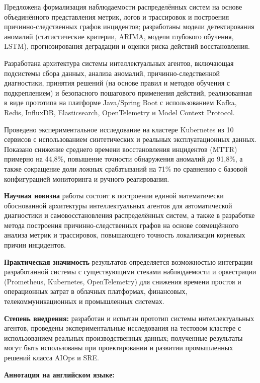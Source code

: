 Предложена формализация наблюдаемости распределённых систем на основе объединённого представления метрик, логов и трассировок и построения причинно-следственных графов инцидентов; разработаны модели детектирования аномалий (статистические критерии, ARIMA, модели глубокого обучения, LSTM), прогнозирования деградации и оценки риска действий восстановления.

Разработана архитектура системы интеллектуальных агентов, включающая подсистемы сбора данных, анализа аномалий, причинно-следственной диагностики, принятия решений (на основе правил и методов обучения с подкреплением) и безопасного пошагового применения действий, реализованная в виде прототипа на платформе Java/Spring Boot с использованием Kafka, Redis, InfluxDB, Elasticsearch, OpenTelemetry и Model Context Protocol.

Проведено экспериментальное исследование на кластере Kubernetes из 10 сервисов с использованием синтетических и реальных эксплуатационных данных. Показано снижение среднего времени восстановления инцидентов (MTTR) примерно на 44{,}8\%, повышение точности обнаружения аномалий до 91{,}8\%, а также сокращение доли ложных срабатываний на 71\% по сравнению с базовой конфигурацией мониторинга и ручного реагирования.

\textbf{Научная новизна} работы состоит в построении единой математически обоснованной архитектуры интеллектуальных агентов для автоматической диагностики и самовосстановления распределённых систем, а также в разработке метода построения причинно-следственных графов на основе совмещённого анализа метрик и трассировок, повышающего точность локализации корневых причин инцидентов.

\textbf{Практическая значимость} результатов определяется возможностью интеграции разработанной системы с существующими стеками наблюдаемости и оркестрации (Prometheus, Kubernetes, OpenTelemetry) для снижения времени простоя и операционных затрат в облачных платформах, финансовых, телекоммуникационных и промышленных системах.

\textbf{Степень внедрения:} разработан и испытан прототип системы интеллектуальных агентов, проведены экспериментальные исследования на тестовом кластере с использованием реальных производственных данных; полученные результаты могут быть использованы при проектировании и развитии промышленных решений класса AIOps и SRE.

\vspace{1cm}

\textbf{Аннотация на английском языке:}

